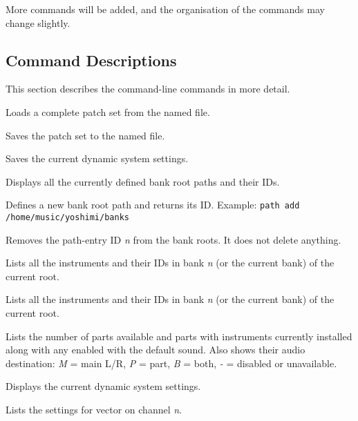    More commands will be added, and the organisation of the commands
   may change slightly.

\subsection{Command Descriptions}
\label{subsec:command_line_command_descriptions}

   This section describes the command-line commands in more detail.

   \setcounter{ItemCounter}{0}      %

      Loads a complete patch set from the named file.

      Saves the patch set to the named file.

      Saves the current dynamic system settings.

      Displays all the currently defined bank root paths and their IDs.

      Defines a new bank root path and returns its ID.
      Example: \texttt{path add /home/music/yoshimi/banks}

      Removes the path-entry ID \textsl{n} from the bank roots. 
      It does not delete anything.

      Lists all the instruments and their IDs in bank \textsl{n} (or the
      current bank) of the current root.

      Lists all the instruments and their IDs in bank \textsl{n}
      (or the current bank) of the current root.

      Lists the number of parts available and parts with instruments
      currently installed along with any enabled with the default sound.
      Also shows their audio destination:
      \textsl{M} = main L/R, \textsl{P} = part, \textsl{B} = both,
      \textsl{-} = disabled or unavailable.

      Displays the current dynamic system settings.

      Lists the settings for vector on channel \textsl{n}.

